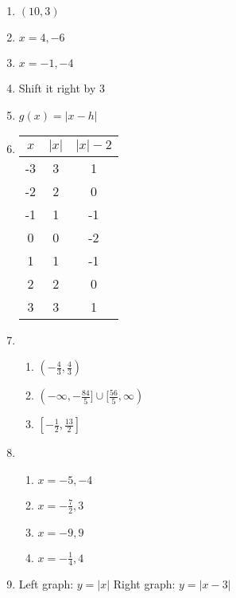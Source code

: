\documentclass{article}
\begin{document}
\begin{enumerate}
\item $(10,3)$

\item $x = 4, -6$

\item $x = -1, -4$

\item Shift it right by 3

\item $g(x) = |x - h|$

\item
	\begin{tabular}{c | c | c}
	$x$ & $|x|$ & $|x| - 2$ \\
	\hline
	-3 & 3 & 1 \\
	-2 & 2 & 0 \\
	-1 & 1 & -1 \\
	0 & 0 & -2 \\
	1 & 1 & -1 \\
	2 & 2 & 0 \\
	3 & 3 & 1
	\end{tabular}
	
\item

	\begin{enumerate}
	
	\item $(-\frac{4}{3}, \frac{4}{3})$
	
	\item $(-\infty, -\frac{84}{5}] \cup [\frac{56}{5}, \infty)$
	
	\item $[-\frac{1}{2}, \frac{13}{2}]$
	
	\end{enumerate}
	
\item

	\begin{enumerate}
	
	\item $x = -5, -4$
	
	\item $x = -\frac{7}{2}, 3$
	
	\item $x = -9, 9$
	
	\item $x = -\frac{1}{4}, 4$
	
	\end{enumerate}
	
\item Left graph: $y = |x|$ \newline
	Right graph: $y = |x - 3|$
	
\end{enumerate}
\end{document}
